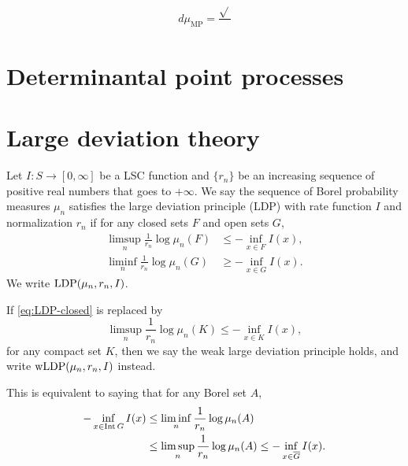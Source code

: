 \begin{namedthm}
    
\end{namedthm}

\begin{namedthm}
    \[
        {d\mu_{\mathrm{MP}}} = \frac{\sqrt{}{}}{}
    \]
\end{namedthm}

\begin{namedthm}
    
\end{namedthm}

\begin{namedthm}
    
\end{namedthm}

\section{Determinantal point processes}

\section{Large deviation theory}

Let $I\colon S \to [0,\infty]$ be a LSC function and $\{r_n\}$ be an increasing sequence of positive real numbers that goes to $+\infty$. We say the sequence of Borel probability measures $\mu_n$ satisfies the large deviation principle (LDP) with rate function $I$ and normalization $r_n$ if for any closed sets $F$ and open sets $G$, \begin{align}
    \limsup_n \frac{1}{r_n} \log \mu_n(F) & \leq -\inf_{x \in F} I(x), \label{eq:LDP-closed} \\
    \liminf_n \frac{1}{r_n} \log \mu_n(G) & \geq -\inf_{x \in G} I(x). \label{eq:LDP-open}
\end{align} We write $\operatorname{LDP}(\mu_n,r_n,I)$.

If \eqref{eq:LDP-closed} is replaced by \begin{equation}
    \limsup_n \frac{1}{r_n} \log \mu_n(K) \leq -\inf_{x \in K} I(x), \label{eq:wLDP-compact}
\end{equation} for any compact set $K$, then we say the weak large deviation principle holds, and write $\operatorname{wLDP}(\mu_n,r_n,I)$ instead.

This is equivalent to saying that for any Borel set $A$, \begin{align*}
    -\inf_{x \in \operatorname{Int} G} I(x) & \leq \liminf_n \frac{1}{r_n} \log \mu_n(A) \\ & \leq \limsup_n \frac{1}{r_n} \log \mu_n(A) \leq -\inf_{x \in \overline{G}} I(x).
\end{align*}

